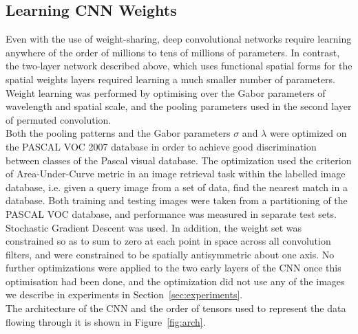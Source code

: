 \subsection{Learning CNN Weights}
Even with the use of weight-sharing, deep convolutional networks require learning anywhere of the order of millions to tens of millions of parameters. In contrast, the two-layer network described above, which uses functional spatial forms for the spatial weights layers required learning a much smaller number of parameters.  Weight learning was performed by optimising over the Gabor parameters of wavelength and spatial scale, and the pooling parameters used in the second layer of permuted convolution.\\

Both the pooling patterns and the Gabor parameters $\sigma$ and $\lambda$ were optimized on the PASCAL VOC 2007 database \cite{everingham2010pascal} in order to achieve good discrimination between classes of the Pascal visual database. The optimization used the criterion of Area-Under-Curve metric in an image retrieval task within the labelled image database, i.e. given a query image from a set of data, find the nearest match in a database.  Both training and testing images were taken from a partitioning of the PASCAL VOC database, and performance was measured in separate test sets.  Stochastic Gradient Descent was used. In addition, the weight set was constrained so as to sum to zero at each point in space across all convolution filters, and were constrained to be spatially antisymmetric about one axis.  No further optimizations were applied to the two early layers of the CNN once this optimisation had been done, and the optimization did not use any of the images we describe in experiments in Section~\ref{sec:experiments}.\\

The architecture of the CNN and the order of tensors used to represent the data flowing through it is shown in Figure~\ref{fig:arch}.

